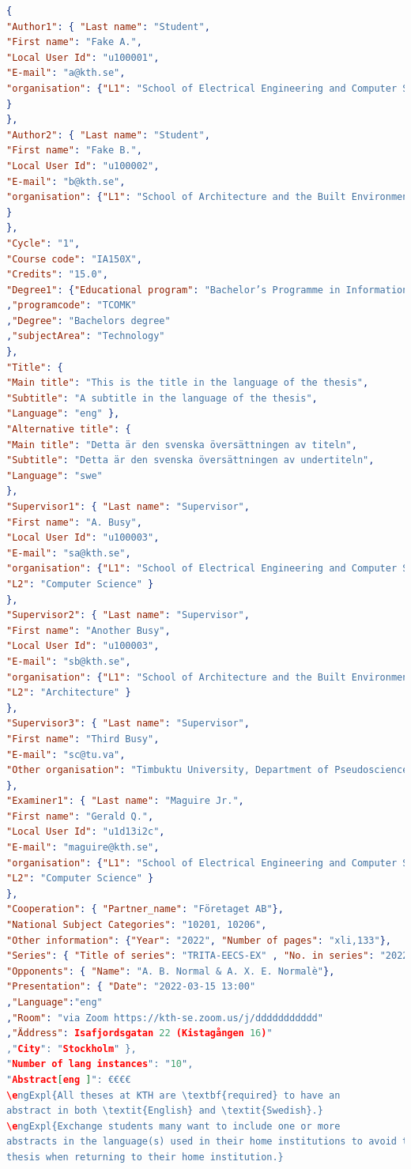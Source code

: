 \begin{lstlisting}[language={json}, caption={Text version of the first page of the For DIVA output}, label=lst:forDIVApg11Text]
{
"Author1": { "Last name": "Student",
"First name": "Fake A.",
"Local User Id": "u100001",
"E-mail": "a@kth.se",
"organisation": {"L1": "School of Electrical Engineering and Computer Science",
}
},
"Author2": { "Last name": "Student",
"First name": "Fake B.",
"Local User Id": "u100002",
"E-mail": "b@kth.se",
"organisation": {"L1": "School of Architecture and the Built Environment",
}
},
"Cycle": "1",
"Course code": "IA150X",
"Credits": "15.0",
"Degree1": {"Educational program": "Bachelor’s Programme in Information and Communication Technology"
,"programcode": "TCOMK"
,"Degree": "Bachelors degree"
,"subjectArea": "Technology"
},
"Title": {
"Main title": "This is the title in the language of the thesis",
"Subtitle": "A subtitle in the language of the thesis",
"Language": "eng" },
"Alternative title": {
"Main title": "Detta är den svenska översättningen av titeln",
"Subtitle": "Detta är den svenska översättningen av undertiteln",
"Language": "swe"
},
"Supervisor1": { "Last name": "Supervisor",
"First name": "A. Busy",
"Local User Id": "u100003",
"E-mail": "sa@kth.se",
"organisation": {"L1": "School of Electrical Engineering and Computer Science",
"L2": "Computer Science" }
},
"Supervisor2": { "Last name": "Supervisor",
"First name": "Another Busy",
"Local User Id": "u100003",
"E-mail": "sb@kth.se",
"organisation": {"L1": "School of Architecture and the Built Environment",
"L2": "Architecture" }
},
"Supervisor3": { "Last name": "Supervisor",
"First name": "Third Busy",
"E-mail": "sc@tu.va",
"Other organisation": "Timbuktu University, Department of Pseudoscience"
},
"Examiner1": { "Last name": "Maguire Jr.",
"First name": "Gerald Q.",
"Local User Id": "u1d13i2c",
"E-mail": "maguire@kth.se",
"organisation": {"L1": "School of Electrical Engineering and Computer Science",
"L2": "Computer Science" }
},
"Cooperation": { "Partner_name": "Företaget AB"},
"National Subject Categories": "10201, 10206",
"Other information": {"Year": "2022", "Number of pages": "xli,133"},
"Series": { "Title of series": "TRITA-EECS-EX" , "No. in series": "2022:00" },
"Opponents": { "Name": "A. B. Normal & A. X. E. Normalè"},
"Presentation": { "Date": "2022-03-15 13:00"
,"Language":"eng"
,"Room": "via Zoom https://kth-se.zoom.us/j/ddddddddddd"
,"Äddress": Isafjordsgatan 22 (Kistagången 16)"
,"City": "Stockholm" },
"Number of lang instances": "10",
"Abstract[eng ]": €€€€
\engExpl{All theses at KTH are \textbf{required} to have an
abstract in both \textit{English} and \textit{Swedish}.}
\engExpl{Exchange students many want to include one or more
abstracts in the language(s) used in their home institutions to avoid the need to write another
thesis when returning to their home institution.}
\end{lstlisting}
